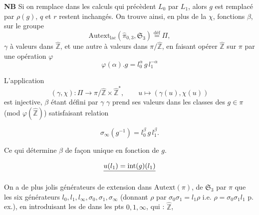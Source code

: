 \documentclass[11pt,a4paper]{article}
\begin{document}
\textbf{NB} Si on remplace dans les calculs qui précèdent $L_0$ par $L_1$, alors
$g$ est remplacé par $\rho(g)$, $q$ et $r$ restent inchangés. On trouve
ainsi, en plus de la  $\chi$, \struck{\ill{}} \ill{}
fonctions \ill{} $\beta$, sur le groupe
\[
\mathrm{Autext}_{\mathrm{lac}}(\hat\pi_{0,3}, \mathfrak{S}_3) \overset{\text{déf}}{=} \Pi,
\]
\struck{\ill{}} $\gamma$ à valeurs dans $\hat{\mathbb{Z}}$, et une autre à valeurs
dans $\pi/\hat{\mathbb{Z}}$, en faisant opérer $\hat{\mathbb{Z}}$ sur $\pi$ par une
opération $\varphi$
\[
\varphi(\alpha).g = l_0^{\alpha}\, g\, l_1^{-\alpha}
\]


L'application
\[
(\gamma, \chi) : \Pi \longrightarrow \pi/\hat{\mathbb{Z}} \times \hat{\mathbb{Z}}^{*},
\qquad u \longmapsto (\gamma(u), \chi(u))
\]
est injective, \struck{\ill{}} $\beta$ étant défini par $\gamma$ \ill{} $\gamma$
prend ses valeurs dans les classes des $g \in \pi$ (mod $\varphi(\hat{\mathbb{Z}})$)
satisfaisant  relation




\[
\sigma_\infty(g^{-1}) = l_0^{\beta}\, g\, l_1^{\beta}.
\]

Ce qui détermine $\beta$ de façon unique en fonction de $g$.

\[
\struck{u(l_1) = \mathrm{int}(g)(l_1)}
\]
 \struck{\ill{}} 


On a de plus jolis générateurs de  extension
dans $\mathrm{Autext}(\pi)$, de $\mathfrak{S}_3$ par $\pi$ que les six générateurs
$l_0, l_1, l_\infty, \sigma_0, \sigma_1, \sigma_\infty$ (donnant $\rho$ par
$\sigma_0\sigma_1 = l_1\rho$  i.e.
$\rho = \sigma_0\sigma_1 l_1$ p. ex.), en introduisant les \ill{} de
 dans les pts $0, 1, \infty$, qui \ill{}
 \ill{} : $\hat{\mathbb{Z}}$,
\end{document}
